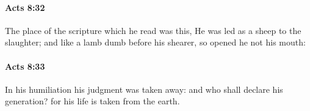 		\paragraph{Acts 8:32} %
			\label{ACTS-8-32}

			The place of the scripture which he read was this, He was led as a sheep to the slaughter; and like a lamb dumb before his shearer, so opened he not his mouth:

			\begin{framed}
			\scriptsize
				\begin{compactdesc}
					\item[SBLG] 
				\end{compactdesc}
			\end{framed}

		\paragraph{Acts 8:33} %
			\label{ACTS-8-33}

			In his humiliation his judgment was taken away: and who shall declare his generation?  for his life is taken from the earth.


